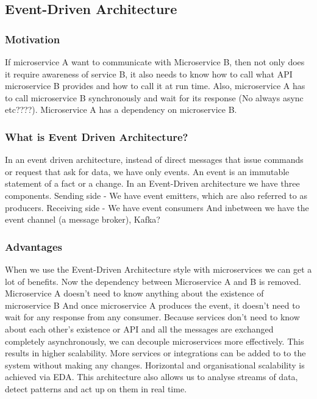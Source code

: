 \documentclass[a4paper, 11pt]{book}
\begin{document}
    \subsection{Event-Driven Architecture}

    \subsubsection{Motivation}
    If microservice A want to communicate with Microservice B, then not only does it require awareness of service B, it also needs to know how to call what API microservice B provides and how to call it at run time.
    Also, microservice A has to call microservice B synchronously and wait for its response (No always async etc????).
    Microservice A has a dependency on microservice B\@.

    \subsubsection{What is Event Driven Architecture?}
    In an event driven architecture, instead of direct messages that issue commands or request that ask for data, we have only events.
    An event is an immutable statement of a fact or a change.
    In an Event-Driven architecture we have three components.
    Sending side - We have event emitters, which are also referred to as producers.
    Receiving side - We have event consumers
    And inbetween we have the event channel (a message broker), Kafka?

    \subsubsection{Advantages}
    When we use the Event-Driven Architecture style with microservices we can get a lot of benefits.
    Now the dependency between Microservice A and B is removed.
    Microservice A doesn't need to know anything about the existence of microservice B
    And once microservice A produces the event, it doesn't need to wait for any response from any consumer.
    Because services don't need to know about each other's existence or API and all the messages are exchanged completely asynchronously, we can decouple microservices more effectively.
    This results in higher scalability.
    More services or integrations can be added to to the system without making any changes.
    Horizontal and organisational scalability is achieved via EDA.
    This architecture also allows us to analyse streams of data, detect patterns and act up on them in real time.
\end{document}
